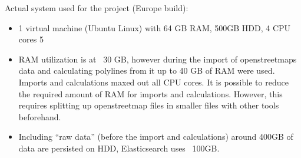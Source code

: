 Actual system used for the project (Europe build):
\begin{itemize}
\item 1 virtual machine (Ubuntu Linux) with 64 GB RAM, 500GB HDD, 4 CPU cores
5
\item RAM utilization is at ~30 GB, however during the import of openstreetmaps data and calculating polylines from it up to 40 GB of RAM were used. Imports and calculations maxed out all CPU cores. It is possible to reduce the required amount of RAM for imports and calculations. However, this requires splitting up openstreetmap files in smaller files with other tools beforehand.
\item Including “raw data” (before the import and calculations) around 400GB of data are persisted on HDD, Elasticsearch uses ~100GB.
\end{itemize}